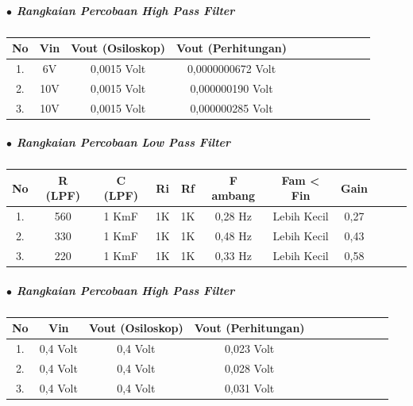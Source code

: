 \documentclass[12pt,a4paper]{article}
\begin{document}
\subparagraph*{$\bullet$ Rangkaian Percobaan High Pass Filter }
\subparagraph*{ }
\begin{tabular}{|c|c|c|c|c|c|c|c|c|c|c|}        \hline
No &  Vin & Vout (Osiloskop) & Vout (Perhitungan)   		\\ \hline 
1. &  6V  & 0,0015 Volt 	 & 0,0000000672 Volt    		\\ \hline
2. &  10V & 0,0015 Volt 	 & 0,000000190 Volt 			\\ \hline
3. &  10V & 0,0015 Volt 	 & 0,000000285 Volt	 			\\ \hline
 \end{tabular}

\subparagraph*{$\bullet$ Rangkaian Percobaan Low Pass Filter }
\subparagraph*{ }
\begin{tabular}{|c|c|c|c|c|c|c|c|c|c|c|}        \hline
No & R (LPF) & C (LPF)  & Ri & Rf & F ambang & Fam < Fin   & Gain    \\ \hline 
1. & 560 	 & 1 KmF 	& 1K & 1K & 0,28 Hz  & Lebih Kecil & 0,27    \\ \hline
2. & 330 	 & 1 KmF	& 1K & 1K & 0,48 Hz  & Lebih Kecil & 0,43  	 \\ \hline
3. & 220	 & 1 KmF 	& 1K & 1K & 0,33 Hz  & Lebih Kecil & 0,58 	 \\ \hline
\end{tabular}
 
\subparagraph*{$\bullet$ Rangkaian Percobaan High Pass Filter }
\subparagraph*{ }
\begin{tabular}{|c|c|c|c|c|c|c|c|c|c|c|}        \hline
No &  Vin 	   & Vout (Osiloskop) & Vout (Perhitungan)   		\\ \hline 
1. &  0,4 Volt & 0,4 Volt 		  & 0,023 Volt    				\\ \hline
2. &  0,4 Volt & 0,4 Volt 		  & 0,028 Volt 					\\ \hline
3. &  0,4 Volt & 0,4 Volt 		  & 0,031 Volt	 				\\ \hline
\end{tabular}


\newpage
\end{document}
